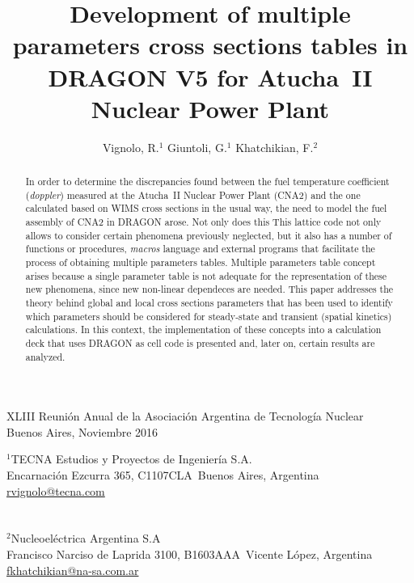 \documentclass[11pt]{article}
\makeatletter
\def\affiliation#1{\def\@affiliation{#1}}
\def\maketitle{%
\thispagestyle{empty}

\null
\vspace{0.5cm plus 0.5cm minus 0.5cm}

\begin{center}
\begin{minipage}{0.8\linewidth}
\begin{center}
\Large{\textbf{\textsc{\@title}}}

\vspace{0.75cm plus 0.2cm minus 0.1cm}

\large{\@author}

\vspace{1.25cm plus 0.25cm minus 0.25cm}

\small{\@affiliation}
\vspace{1cm plus 0.2cm minus 0.2cm}

\end{center}
\end{minipage}
\end{center}

}
\makeatother
\begin{document}
\vfill

\begin{center}
\begin{small}
XLIII Reunión Anual de la Asociación Argentina de Tecnología Nuclear\\
Buenos Aires, Noviembre 2016
\end{small}
\end{center}

\pagebreak

\title{Development of multiple parameters cross sections tables in DRAGON V5 for Atucha~II Nuclear Power Plant}
\author{Vignolo, R.$^{1}$ \quad Giuntoli, G.$^{1}$ \quad Khatchikian, F.$^{2}$}
\affiliation{%
$^1$TECNA Estudios y Proyectos de Ingeniería S.A.\\
Encarnaci\'on Ezcurra 365, C1107CLA~Buenos Aires, Argentina\\
\url{rvignolo@tecna.com}\\
~\\
~\\
$^2$Nucleoeléctrica Argentina S.A\\
Francisco Narciso de Laprida 3100, B1603AAA~Vicente López, Argentina\\
\url{fkhatchikian@na-sa.com.ar}\\
}


\maketitle

\begin{abstract}
\noindent
In order to determine the discrepancies found between the fuel temperature coefficient (\emph{doppler}) measured at the Atucha~II Nuclear Power Plant (CNA2) and the one calculated based on WIMS cross sections in the usual way, the need to model the fuel assembly of CNA2 in DRAGON arose. Not only does this This lattice code not only allows to consider certain phenomena previously neglected, but it also has a number of functions or procedures, \emph{macros} language and external programs that facilitate the process of obtaining multiple parameters tables. Multiple parameters table concept arises because a single parameter table is not adequate for the representation of these new phenomena, since new non-linear dependeces are needed. This paper addresses the theory behind global and local cross sections parameters that has been used to identify which parameters should be considered for steady-state and transient (spatial kinetics) calculations. In this context, the implementation of these concepts into a calculation deck that uses DRAGON as cell code is presented and, later on, certain results are analyzed.
\end{abstract}
\end{document}
